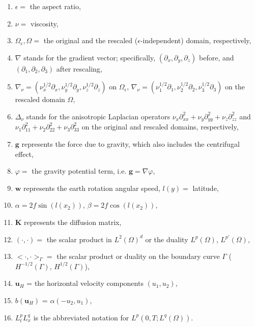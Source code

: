 \documentclass[11pt]{article}
\begin{document}
\begin{enumerate}

\item $\epsilon = $ the aspect ratio,
\item $\nu = $ viscosity,
\item $\Omega_\epsilon, \Omega = $ the original and the rescaled ($\epsilon$-independent) domain, respectively,
\item $\nabla$ stands for the gradient vector; specifically, $(\partial_x, \partial_y, \partial_z)$ before, and $(\partial_1, \partial_2, \partial_3)$ after rescaling,
\item $\nabla_\nu = (\nu_x^{1/2} \partial_x, \nu_y^{1/2} \partial_y, \nu_z^{1/2} \partial_z)$ on $\Omega_\epsilon$, $\nabla_\nu = (\nu_1^{1/2} \partial_1, \nu_2^{1/2} \partial_2, \nu_3^{1/2} \partial_3)$ on the rescaled domain $\Omega,$
\item $ \Delta_\nu$ stands for the anisotropic Laplacian operators $\nu_x \partial^2_{xx} + \nu_y \partial^2_{yy}  + \nu_z \partial^2_{zz}$ and $\nu_1 \partial^2_{11} + \nu_2 \partial^2_{22}  + \nu_3 \partial^2_{33}$ on the original and rescaled domains, respectively,
\item $\mathbf{g}$ represents the force due to gravity, which also includes the centrifugal effect,
\item $\varphi = $ the gravity potential term, i.e. $\mathbf{g} = \nabla \varphi,$
\item $\mathbf{w}$ represents the earth rotation angular speed, $l(y) = $ latitude,
\item $\alpha = 2 f \sin (l(x_2))$, $\beta = 2 f \cos (l(x_2)),$
\item $\mathbf{K}$ represents the diffusion matrix,
\item $( \cdot,\cdot) = $ the scalar product in $L^2(\Omega)^d$ or the duality $L^p (\Omega)$, $L^{p'} (\Omega),$
\item $< \cdot,\cdot>_{\Gamma} = $ the scalar product or duality on the boundary curve $\Gamma$ ($H^{-1/2}(\Gamma)$, $H^{1/2}(\Gamma)$),
\item $\mathbf{u}_H$ = the horizontal velocity components $(u_1, u_2),$
\item $b(\mathbf{u}_H)$ = $\alpha (-u_2 , u_1),$
\item $L^p_t L^q_x$ is the abbreviated notation for $L^p (0, T; L^q(\Omega)).$

\end{enumerate}

\end{document}
